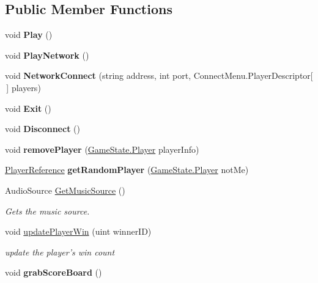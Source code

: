 \subsection*{Public Member Functions}
\begin{DoxyCompactItemize}
\item 
\hypertarget{class_game_manager_a3403831c40f16191e3997be60d95380b}{void {\bfseries Play} ()}\label{class_game_manager_a3403831c40f16191e3997be60d95380b}

\item 
\hypertarget{class_game_manager_a1138f86278583414cba9456d02d0fa1c}{void {\bfseries Play\-Network} ()}\label{class_game_manager_a1138f86278583414cba9456d02d0fa1c}

\item 
\hypertarget{class_game_manager_a3c3a8e05664851d7642c13989af691cf}{void {\bfseries Network\-Connect} (string address, int port, Connect\-Menu.\-Player\-Descriptor\mbox{[}$\,$\mbox{]} players)}\label{class_game_manager_a3c3a8e05664851d7642c13989af691cf}

\item 
\hypertarget{class_game_manager_a5d9cafdd495a4ed2760de13b7b9c80b6}{void {\bfseries Exit} ()}\label{class_game_manager_a5d9cafdd495a4ed2760de13b7b9c80b6}

\item 
\hypertarget{class_game_manager_adb53a672ec492ed3a0cb89ca00808bd4}{void {\bfseries Disconnect} ()}\label{class_game_manager_adb53a672ec492ed3a0cb89ca00808bd4}

\item 
\hypertarget{class_game_manager_aebdaf24911f168c490194f548297f8d1}{void {\bfseries remove\-Player} (\hyperlink{struct_game_state_1_1_player}{Game\-State.\-Player} player\-Info)}\label{class_game_manager_aebdaf24911f168c490194f548297f8d1}

\item 
\hypertarget{class_game_manager_aadd5e389068b81b09036cc2bb8c097d6}{\hyperlink{class_player_reference}{Player\-Reference} {\bfseries get\-Random\-Player} (\hyperlink{struct_game_state_1_1_player}{Game\-State.\-Player} not\-Me)}\label{class_game_manager_aadd5e389068b81b09036cc2bb8c097d6}

\item 
Audio\-Source \hyperlink{class_game_manager_abf59d5ce551af5e35529f71a99d89d76}{Get\-Music\-Source} ()
\begin{DoxyCompactList}\small\item\em Gets the music source. \end{DoxyCompactList}\item 
void \hyperlink{class_game_manager_a6a788456fbde7a3587013f1707586f73}{update\-Player\-Win} (uint winner\-I\-D)
\begin{DoxyCompactList}\small\item\em update the player's win count \end{DoxyCompactList}\item 
\hypertarget{class_game_manager_a414dcfd0d1f5a5904d2440165e42923d}{void {\bfseries grab\-Score\-Board} ()}\label{class_game_manager_a414dcfd0d1f5a5904d2440165e42923d}

\end{DoxyCompactItemize}
